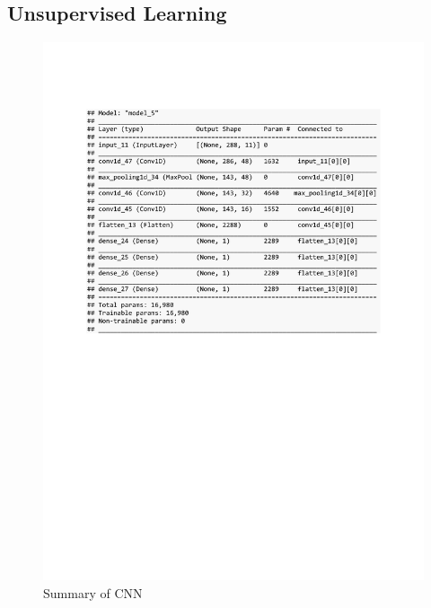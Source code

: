 \subsection{Unsupervised Learning}
\begin{figure}[h]
	\centering
	\includegraphics[scale=0.5]{Figures/summary_CNN_pred_house_temp}
	\decoRule
	\caption[Synthetic Anomalies]{Summary of CNN \parencite{own}}
	\label{fig:summary_CNN_pred_syn}
\end{figure}

